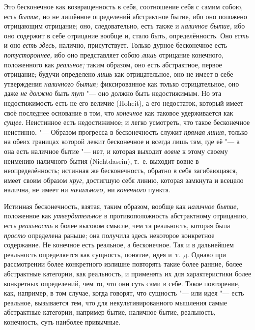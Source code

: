 Это бесконечное как возвращенность в себя, соотношение себя с самим собою,
есть {\em бытие,} но не лишённое определений
абстрактное бытие, ибо оно положено отрицающим отрицание; оно,
следовательно, есть также и {\em наличное бытие,} ибо
оно содержит в себе отрицание вообще и, стало быть, определённость. Оно
{\em есть} и оно {\em есть здесь,}
налично, присутствует. Только дурное бесконечное есть
{\em потустороннее,} ибо оно представляет собою
{\em лишь} отрицание конечного, положенного как
{\em реальное;} таким образом, оно есть абстрактное,
первое отрицание; будучи определено {\em лишь} как
отрицательное, оно не имеет в себе утверждения
{\em наличного бытия;} фиксированное как только
отрицательное, оно даже {\em не должно} быть
{\em тут} "--- оно должно быть недостижимым. Но эта
недостижимость есть не его величие (Hoheit), а его недостаток, который
имеет своё последнее основание в том, что
{\em конечное} как таковое удерживается как
{\em сущее}. Неистинное есть недостижимое; и легко
усмотреть, что такое бесконечное неистинно. "--- Образом прогресса в
бесконечность служит {\em прямая линия,} только на
обеих границах которой лежит бесконечное и всегда лишь там, где её "--- а она
есть наличное бытие "--- нет, и которая выходит
{\em вовне} к этому своему неимению наличного бытия
(Nicht\-dasein), т.~е. выходит вовне в неопределённость; истинная же
бесконечность, обратно в себя загибающаяся, имеет своим образом
{\em круг,} достигшую себя линию, которая замкнута и
всецело налична, не имеет ни {\em начального,} ни {\em конечного} пункта.

Истинная бесконечность, взятая, таким образом, вообще как
{\em наличное бытие,} положенное как
{\em утвердительное} в противоположность абстрактному
отрицанию, есть {\em реальность} в более высоком
смысле, чем та реальность, которая была {\em просто}
определена раньше; она получила здесь некоторое конкретное содержание. Не
конечное есть реальное, а бесконечное. Так и в дальнейшем реальность
определяется как сущность, понятие, идея и~т.~д. Однако при рассмотрении
более конкретного излишне повторять такие более ранние, более абстрактные
категории, как реальность, и применять их для характеристики более
конкретных определений, чем то, что они суть сами в себе. Такое повторение,
как, например, в том случае, когда говорят,
что сущность "--- или идея "--- есть
реальное, вызывается тем, что для некультивированного мышления самые
абстрактные категории, например бытие, наличное бытие, реальность,
конечность, суть наиболее привычные.

